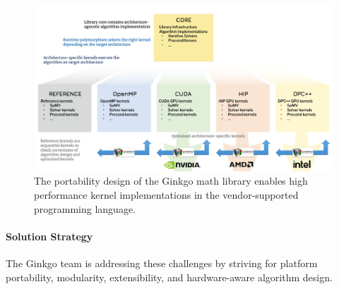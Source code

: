 \begin{figure}[!h]
\centering
\includegraphics[width=.8\columnwidth]{projects/2.3.3-MathLibs/2.3.3.13-CLOVER/ginkgo_portability_crop}
\caption{\label{fig:ginkgoportability}The portability design of the Ginkgo math
  library enables high performance kernel implementations in the vendor-supported
  programming language.}
\end{figure}


\paragraph{Solution Strategy}

The Ginkgo team is addressing these challenges by striving for platform
portability, modularity, extensibility, and hardware-aware algorithm design.

